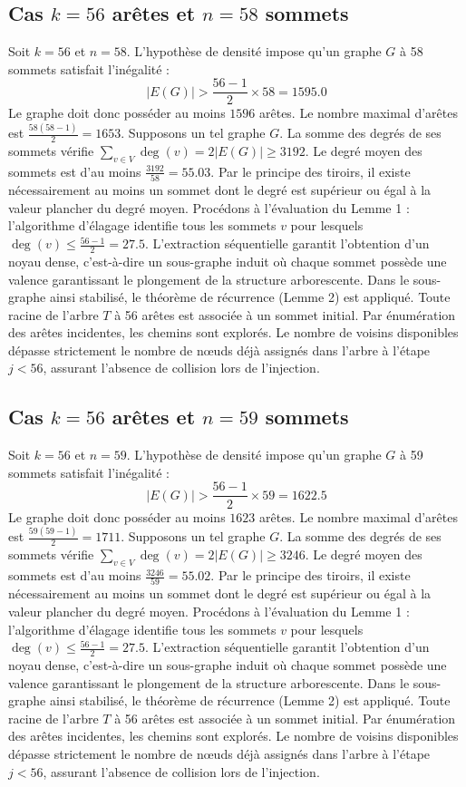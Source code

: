 \documentclass[12pt,a4paper]{article}
\begin{document}
\subsection{Cas $k = 56$ arêtes et $n = 58$ sommets}
Soit $k = 56$ et $n = 58$. L'hypothèse de densité impose qu'un graphe $G$ à 58 sommets satisfait l'inégalité :
$$ |E(G)| > \frac{56-1}{2} \times 58 = 1595.0 $$
Le graphe doit donc posséder au moins $1596$ arêtes. Le nombre maximal d'arêtes est $\frac{58(58-1)}{2} = 1653$.
Supposons un tel graphe $G$. La somme des degrés de ses sommets vérifie $\sum_{v \in V} \deg(v) = 2|E(G)| \geq 3192$.
Le degré moyen des sommets est d'au moins $\frac{3192}{58} = 55.03$.
Par le principe des tiroirs, il existe nécessairement au moins un sommet dont le degré est supérieur ou égal à la valeur plancher du degré moyen.
Procédons à l'évaluation du Lemme 1 : l'algorithme d'élagage identifie tous les sommets $v$ pour lesquels $\deg(v) \leq \frac{56-1}{2} = 27.5$.
L'extraction séquentielle garantit l'obtention d'un noyau dense, c'est-à-dire un sous-graphe induit où chaque sommet possède une valence garantissant le plongement de la structure arborescente.
Dans le sous-graphe ainsi stabilisé, le théorème de récurrence (Lemme 2) est appliqué. Toute racine de l'arbre $T$ à 56 arêtes est associée à un sommet initial. Par énumération des arêtes incidentes, les chemins sont explorés. Le nombre de voisins disponibles dépasse strictement le nombre de nœuds déjà assignés dans l'arbre à l'étape $j < 56$, assurant l'absence de collision lors de l'injection.

\subsection{Cas $k = 56$ arêtes et $n = 59$ sommets}
Soit $k = 56$ et $n = 59$. L'hypothèse de densité impose qu'un graphe $G$ à 59 sommets satisfait l'inégalité :
$$ |E(G)| > \frac{56-1}{2} \times 59 = 1622.5 $$
Le graphe doit donc posséder au moins $1623$ arêtes. Le nombre maximal d'arêtes est $\frac{59(59-1)}{2} = 1711$.
Supposons un tel graphe $G$. La somme des degrés de ses sommets vérifie $\sum_{v \in V} \deg(v) = 2|E(G)| \geq 3246$.
Le degré moyen des sommets est d'au moins $\frac{3246}{59} = 55.02$.
Par le principe des tiroirs, il existe nécessairement au moins un sommet dont le degré est supérieur ou égal à la valeur plancher du degré moyen.
Procédons à l'évaluation du Lemme 1 : l'algorithme d'élagage identifie tous les sommets $v$ pour lesquels $\deg(v) \leq \frac{56-1}{2} = 27.5$.
L'extraction séquentielle garantit l'obtention d'un noyau dense, c'est-à-dire un sous-graphe induit où chaque sommet possède une valence garantissant le plongement de la structure arborescente.
Dans le sous-graphe ainsi stabilisé, le théorème de récurrence (Lemme 2) est appliqué. Toute racine de l'arbre $T$ à 56 arêtes est associée à un sommet initial. Par énumération des arêtes incidentes, les chemins sont explorés. Le nombre de voisins disponibles dépasse strictement le nombre de nœuds déjà assignés dans l'arbre à l'étape $j < 56$, assurant l'absence de collision lors de l'injection.
\end{document}
